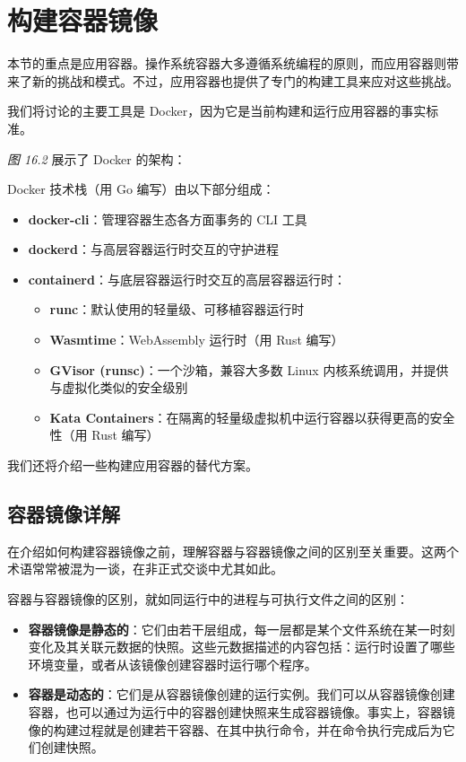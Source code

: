 \section{构建容器镜像}

\label{idx:1738}
本节的重点是应用容器。操作系统容器大多遵循系统编程的原则，而应用容器则带来了新的挑战和模式。不过，应用容器也提供了专门的构建工具来应对这些挑战。

我们将讨论的主要工具是 Docker，因为它是当前构建和运行应用容器的事实标准。

\emph{图 16.2} 展示了 Docker 的架构：


Docker 技术栈（用 Go 编写）由以下部分组成：

\begin{itemize}
\item \textbf{docker-cli}：管理容器生态各方面事务的 CLI 工具
\item \textbf{dockerd}：与高层容器运行时交互的守护进程
\item \textbf{containerd}：与底层容器运行时交互的高层容器运行时：

\begin{itemize}
\item \textbf{runc}：默认使用的轻量级、可移植容器运行时
\item \textbf{Wasmtime}：WebAssembly 运行时（用 Rust 编写）
\item \textbf{GVisor (runsc)}：一个沙箱，兼容大多数 Linux 内核系统调用，并提供与虚拟化类似的安全级别
\item \textbf{Kata Containers}：在隔离的轻量级虚拟机中运行容器以获得更高的安全性（用 Rust 编写）
\end{itemize}
\end{itemize}

\label{idx:1739}
我们还将介绍一些构建应用容器的替代方案。

\subsection{容器镜像详解}

在介绍如何构建容器镜像之前，理解容器与容器镜像之间的区别至关重要。这两个术语常常被混为一谈，在非正式交谈中尤其如此。

容器与容器镜像的区别，就如同运行中的进程与可执行文件之间的区别：

\begin{itemize}
\label{idx:1740}
\item \textbf{容器镜像是静态的}：它们由若干层组成，每一层都是某个文件系统在某一时刻变化及其关联元数据的快照。这些元数据描述的内容包括：运行时设置了哪些环境变量，或者从该镜像创建容器时运行哪个程序。
\label{idx:1741}
\item \textbf{容器是动态的}：它们是从容器镜像创建的运行实例。我们可以从容器镜像创建容器，也可以通过为运行中的容器创建快照来生成容器镜像。事实上，容器镜像的构建过程就是创建若干容器、在其中执行命令，并在命令执行完成后为它们创建快照。
\end{itemize}

